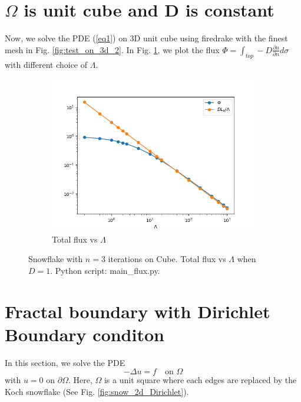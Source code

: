 \documentclass[12pt]{article}%
\theoremstyle{plain}
\numberwithin{equation}{section}
\begin{document}
\section{$\Omega$ is unit cube and D is constant}
Now, we solve the PDE (\ref{eq1}) on 3D unit cube using firedrake with the finest mesh in Fig. \ref{fig:test_on_3d_2}. In Fig. \ref{flux_cube}, we plot the flux $\Phi=\int_{top}-D\frac{\partial u}{\partial n}d\sigma$ with different choice of $\Lambda$.
  \begin{figure}[H]%
    \centering
 \begin{subfigure}[h]{0.45\linewidth}
         \caption{Total flux vs $\Lambda$}
\includegraphics[width=\linewidth]{figures/Ex2/Phi_Lam_cube.png}
\end{subfigure}
  \caption{Snowflake with $n=3$ iterations on Cube. Total flux vs $\Lambda$ when $D=1$. Python script: main\_flux.py.}
  \label{flux_cube}
 \end{figure}



\section{Fractal boundary with Dirichlet Boundary conditon}
In this section, we solve the PDE 
\begin{equation}
-\Delta u =f \quad\text{on }\Omega
\label{eqn:Ex3}
\end{equation}
with $u=0$ on $\partial \Omega$. Here, $\Omega$ is a unit square where each edges are replaced by the Koch snowflake (See Fig. \ref{fig:snow_2d_Dirichlet}).
\end{document}
